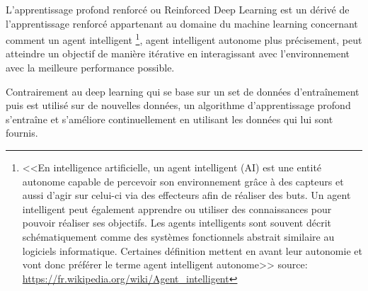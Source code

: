 L'apprentissage profond renforcé ou Reinforced Deep Learning est un dérivé de l'apprentissage 
renforcé appartenant au domaine du machine learning concernant comment un agent intelligent
\footnote{<<En intelligence artificielle, un agent intelligent (AI) est une entité autonome capable de 
percevoir son environnement grâce à des capteurs et aussi d'agir sur celui-ci via des effecteurs 
afin de réaliser des buts. 
Un agent intelligent peut également apprendre ou utiliser des connaissances pour pouvoir réaliser
 ses objectifs. Les agents intelligents sont souvent décrit schématiquement comme des systèmes fonctionnels abstrait 
similaire au logiciels informatique. Certaines définition mettent en avant leur autonomie 
et vont donc préférer le terme agent intelligent autonome>> \newline
source: \url{https://fr.wikipedia.org/wiki/Agent_intelligent} \newline},
agent intelligent autonome plus précisement, peut atteindre un objectif de manière itérative en 
interagissant avec l'environnement avec la meilleure performance possible. \newline

Contrairement au deep learning qui se base sur un set de données d'entraînement
puis est utilisé sur de nouvelles données, un algorithme d'apprentissage profond
s'entraîne et s'améliore continuellement en utilisant les données qui lui sont 
fournis. \newline 

